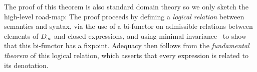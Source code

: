 The proof of this theorem is also standard domain theory so we only sketch the 
high-level road-map: The proof proceeds by defining a {\em logical relation} between 
semantics and syntax, via the use of a bi-functor on admissible relations between elements 
of $D_\infty$ and closed expressions, and using minimal 
invariance~\cite{pitts-rel-domains} to show that this
bi-functor has a fixpoint. Adequacy then follows from the {\em fundamental theorem} of this 
logical relation, which asserts that every expression is related to its denotation.



